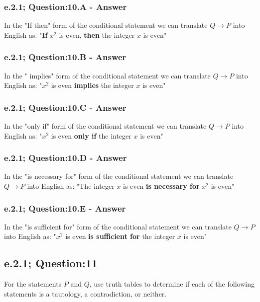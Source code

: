 \subsubsection*{e.2.1; Question:10.A - Answer}
In the "If then" form of the conditional statement we can translate $Q \to P$ into English as: "{\bf If} $x^2$ is even, {\bf then} the integer $x$ is even" \\


\subsubsection*{e.2.1; Question:10.B - Answer}
In the " implies" form of the conditional statement we can translate $Q \to P$ into English as: "$x^2$ is even {\bf implies} the integer $x$ is even" \\


\subsubsection*{e.2.1; Question:10.C - Answer}
In the "only if" form of the conditional statement we can translate $Q \to P$ into English as: "$x^2$ is even {\bf only if} the integer $x$ is even" \\

\subsubsection*{e.2.1; Question:10.D - Answer}
In the "is necessary for" form of the conditional statement we can translate $Q \to P$ into English as: "The integer $x$ is even {\bf is necessary for} $x^2$ is even" \\

\subsubsection*{e.2.1; Question:10.E - Answer}
In the "is sufficient for" form of the conditional statement we can translate $Q \to P$ into English as: "$x^2$ is even {\bf is sufficient for} the integer $x$ is even" \\


\newpage
\subsection{e.2.1; Question:11}
For the statements $P$ and $Q$, use truth tables to determine if each of the following statements is a tautology, a contradiction, or neither. \\


